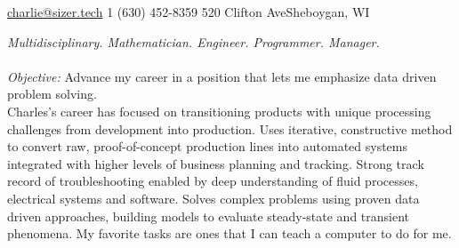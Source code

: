 \documentclass[10pt,a4paper]{article} %
\begin{document}
 



\noindent\href{mailtto:charlie@sizer.tech}{charlie@sizer.tech}\bull %
\textsmaller{+}1 (630) 452-8359\bull %
520 Clifton Ave\bull Sheboygan, WI%

\spacedhrule{0.9em}{-0.4em} %



\vspace{-1.3em} %

\begin{multicols}{2}  %
\noindent \textit{Multidisciplinary. Mathematician. Engineer. Programmer. Manager.}\\\\
\emph{Objective: }Advance my career in a position that lets me emphasize  data driven problem solving. \\

Charles's career has focused on transitioning products with unique processing challenges from development into production.  Uses iterative, constructive method to convert raw, proof-of-concept production lines into automated systems integrated with higher levels of business planning and tracking. Strong track record of troubleshooting enabled by deep understanding of fluid processes, electrical systems and software. Solves complex problems using proven data driven approaches, building models to evaluate steady-state and transient phenomena. My favorite tasks are ones that I can teach a computer to do for me. 

\end{multicols}
\end{document}
